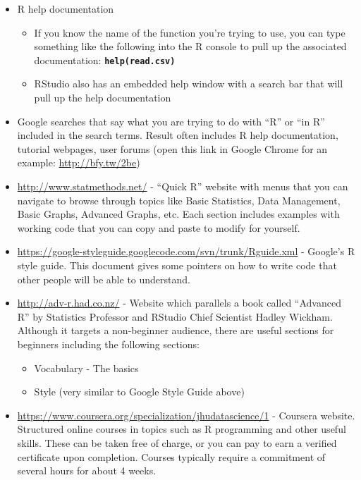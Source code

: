 \documentclass[]{article}
\begin{document}
\begin{itemize}
\itemsep1pt\parskip0pt
\item
  R help documentation

  \begin{itemize}
  \itemsep1pt\parskip0pt
  \item
    If you know the name of the function you're trying to use, you can
    type something like the following into the R console to pull up the
    associated documentation: \textbf{\texttt{help(read.csv)}}
  \item
    RStudio also has an embedded help window with a search bar that will
    pull up the help documentation
  \end{itemize}
\item
  Google searches that say what you are trying to do with ``R'' or ``in
  R'' included in the search terms. Result often includes R help
  documentation, tutorial webpages, user forums (open this link in
  Google Chrome for an example: \url{http://bfy.tw/2be})
\item
  \url{http://www.statmethods.net/} - ``Quick R'' website with menus
  that you can navigate to browse through topics like Basic Statistics,
  Data Management, Basic Graphs, Advanced Graphs, etc. Each section
  includes examples with working code that you can copy and paste to
  modify for yourself.
\item
  \url{https://google-styleguide.googlecode.com/svn/trunk/Rguide.xml} -
  Google's R style guide. This document gives some pointers on how to
  write code that other people will be able to understand.\\
\item
  \url{http://adv-r.had.co.nz/} - Website which parallels a book called
  ``Advanced R'' by Statistics Professor and RStudio Chief Scientist
  Hadley Wickham. Although it targets a non-beginner audience, there are
  useful sections for beginners including the following sections:

  \begin{itemize}
  \itemsep1pt\parskip0pt
  \item
    Vocabulary - The basics
  \item
    Style (very similar to Google Style Guide above)
  \end{itemize}
\item
  \url{https://www.coursera.org/specialization/jhudatascience/1} -
  Coursera website. Structured online courses in topics such as R
  programming and other useful skills. These can be taken free of
  charge, or you can pay to earn a verified certificate upon completion.
  Courses typically require a commitment of several hours for about 4
  weeks.
\end{itemize}
\end{document}
